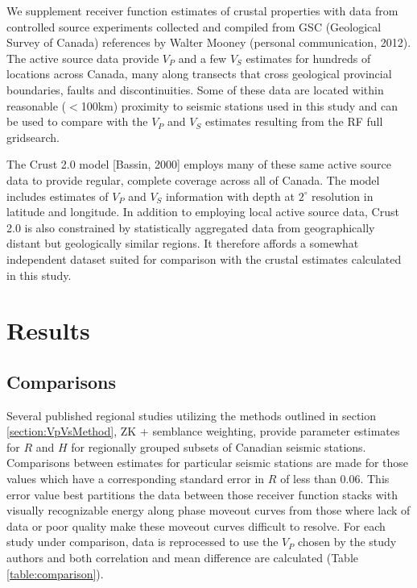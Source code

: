 \documentclass[draft, 12pt]{article}
\begin{document}
We supplement receiver function estimates of crustal properties with data from controlled source experiments collected and compiled from GSC (Geological Survey of Canada) references by Walter Mooney (personal communication, 2012). The active source data provide $V_P$ and a few $V_S$ estimates for hundreds of locations across Canada, many along transects that cross geological provincial boundaries, faults and discontinuities. Some of these data are located within reasonable ($<$100km) proximity to seismic stations used in this study and can be used to compare with the $V_P$ and $V_S$ estimates resulting from the RF full gridsearch.

The Crust 2.0 model [Bassin, 2000] employs many of these same active source data to provide regular, complete coverage across all of Canada. The model includes estimates of $V_P$ and $V_S$ information with depth at
$2^\circ$ resolution in latitude and longitude. In addition to employing local active source data, Crust 2.0 is also constrained by statistically aggregated data from geographically distant but geologically similar regions. It therefore affords a somewhat independent dataset suited for comparison with the crustal estimates calculated in this study.

\section{Results}

\subsection{Comparisons}

Several published regional studies utilizing the methods outlined in section \ref{section:VpVsMethod}, ZK + semblance weighting, provide parameter estimates for $R$ and $H$ for regionally grouped subsets of Canadian seismic stations. Comparisons between estimates for particular seismic stations are made for those values which have a corresponding standard error in $R$ of less than 0.06. This error value best partitions the data between those receiver function stacks with visually recognizable energy along phase moveout curves from those where lack of data or poor quality make these moveout curves difficult to resolve. For each study under comparison, data is reprocessed to use the $V_P$ chosen by the study authors and both correlation and mean difference are calculated (Table \ref{table:comparison}).
\end{document}
